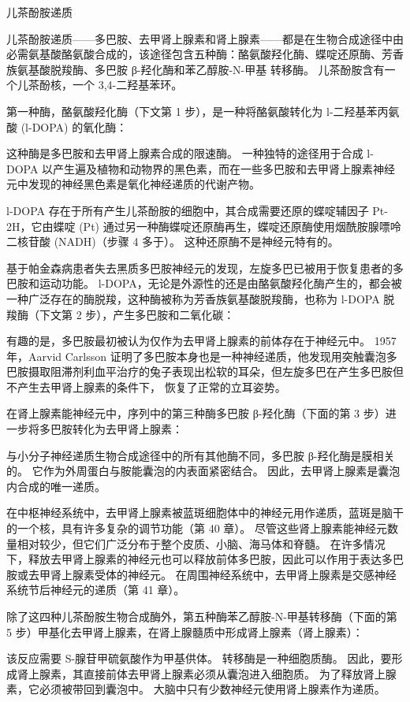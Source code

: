 儿茶酚胺递质

儿茶酚胺递质——多巴胺、去甲肾上腺素和肾上腺素——都是在生物合成途径中由必需氨基酸酪氨酸合成的，该途径包含五种酶：酪氨酸羟化酶、蝶啶还原酶、芳香族氨基酸脱羧酶、多巴胺 β-羟化酶和苯乙醇胺-N-甲基 转移酶。 儿茶酚胺含有一个儿茶酚核，一个 3,4-二羟基苯环。

第一种酶，酪氨酸羟化酶（下文第 1 步），是一种将酪氨酸转化为 l-二羟基苯丙氨酸 (l-DOPA) 的氧化酶：

这种酶是多巴胺和去甲肾上腺素合成的限速酶。 一种独特的途径用于合成 l-DOPA 以产生遍及植物和动物界的黑色素，而在一些多巴胺和去甲肾上腺素神经元中发现的神经黑色素是氧化神经递质的代谢产物。

l-DOPA 存在于所有产生儿茶酚胺的细胞中，其合成需要还原的蝶啶辅因子 Pt-2H，它由蝶啶 (Pt) 通过另一种酶蝶啶还原酶再生，蝶啶还原酶使用烟酰胺腺嘌呤二核苷酸 (NADH)（步骤 4 多于）。 这种还原酶不是神经元特有的。

基于帕金森病患者失去黑质多巴胺神经元的发现，左旋多巴已被用于恢复患者的多巴胺和运动功能。 l-DOPA，无论是外源性的还是由酪氨酸羟化酶产生的，都会被一种广泛存在的酶脱羧，这种酶被称为芳香族氨基酸脱羧酶，也称为 l-DOPA 脱羧酶（下文第 2 步），产生多巴胺和二氧化碳：

有趣的是，多巴胺最初被认为仅作为去甲肾上腺素的前体存在于神经元中。 1957 年，Aarvid Carlsson 证明了多巴胺本身也是一种神经递质，他发现用突触囊泡多巴胺摄取阻滞剂利血平治疗的兔子表现出松软的耳朵，但左旋多巴在产生多巴胺但不产生去甲肾上腺素的条件下， 恢复了正常的立耳姿势。

在肾上腺素能神经元中，序列中的第三种酶多巴胺 β-羟化酶（下面的第 3 步）进一步将多巴胺转化为去甲肾上腺素：

与小分子神经递质生物合成途径中的所有其他酶不同，多巴胺 β-羟化酶是膜相关的。 它作为外周蛋白与胺能囊泡的内表面紧密结合。 因此，去甲肾上腺素是囊泡内合成的唯一递质。

在中枢神经系统中，去甲肾上腺素被蓝斑细胞体中的神经元用作递质，蓝斑是脑干的一个核，具有许多复杂的调节功能（第 40 章）。 尽管这些肾上腺素能神经元数量相对较少，但它们广泛分布于整个皮质、小脑、海马体和脊髓。 在许多情况下，释放去甲肾上腺素的神经元也可以释放前体多巴胺，因此可以作用于表达多巴胺或去甲肾上腺素受体的神经元。 在周围神经系统中，去甲肾上腺素是交感神经系统节后神经元的递质（第 41 章）。

除了这四种儿茶酚胺生物合成酶外，第五种酶苯乙醇胺-N-甲基转移酶（下面的第 5 步）甲基化去甲肾上腺素，在肾上腺髓质中形成肾上腺素（肾上腺素）：

该反应需要 S-腺苷甲硫氨酸作为甲基供体。 转移酶是一种细胞质酶。 因此，要形成肾上腺素，其直接前体去甲肾上腺素必须从囊泡进入细胞质。 为了释放肾上腺素，它必须被带回到囊泡中。 大脑中只有少数神经元使用肾上腺素作为递质。

